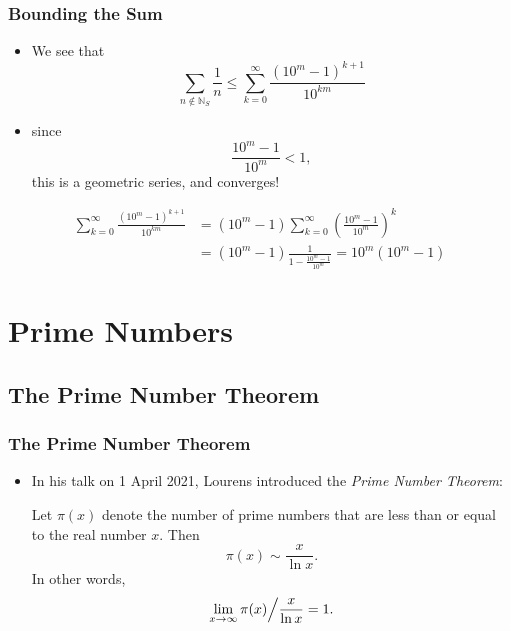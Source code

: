 \documentclass{beamer}
\begin{document}
\begin{frame}
    \frametitle{Bounding the Sum}

    \begin{itemize}
        \item We see that
        \[
            \sum_{n \not\in \mathbb{N}_S} \frac{1}{n} \leq \sum_{k = 0}^{\infty} \frac{\left( 10^m - 1 \right)^{k + 1}}{10^{km}}
        \]
        \pause
        \item  since
        \[
            \frac{10^m - 1}{10^m} < 1,
        \]
        this is a geometric series, and converges!
    \end{itemize}
    \pause
    \begin{align*}
        \sum_{k = 0}^{\infty} \frac{\left( 10^m - 1 \right)^{k + 1}}{10^{km}} & = \left( 10^m - 1 \right) \sum_{k = 0}^{\infty} \left( \frac{10^m - 1}{10^m} \right)^k \\
        & = \left( 10^m - 1 \right) \frac{1}{1 - \frac{10^m - 1}{10^m}} = 10^m \left( 10^m - 1 \right)
    \end{align*}

\end{frame}

\section{Prime Numbers}
\subsection{The Prime Number Theorem}

\begin{frame}
    \frametitle{The Prime Number Theorem}

    \begin{itemize}
        \item In his talk on 1 April 2021, Lourens introduced the \emph{Prime Number Theorem}:
        \begin{theorem}
            Let $\pi(x)$ denote the number of prime numbers that are less than or equal to the real number $x$. Then
            \[
                \pi(x) \sim \frac{x}{\ln x}.    
            \]
            In other words,
            \[
                \lim_{x \to \infty} \pi(x) \Big\slash \frac{x}{\ln x} = 1.
            \]
        \end{theorem}
    \end{itemize}

\end{frame}
\end{document}
